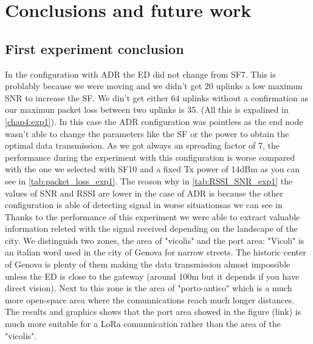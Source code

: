 \chapter{Conclusions and future work}
\label{chap:conclusions}
\ifpdf
    \graphicspath{{Conclusions/Figures/PNG/}{Conclusions/Figures/PDF/}{Conclusions/Figures/}}
\else
    \graphicspath{{Conclusions/Figures/EPS/}{Conclusions/Figures/}}
\fi

\section{First experiment conclusion}

In the configuration with ADR the ED did not change from SF7. This is problably because 
we were moving and we didn't get 20 uplinks a low maximun SNR to increase the SF. We din't 
get either 64 uplinks without a confirmation as our maximun packet loss between two uplinks 
is 35. (All this is expalined in \ref{chap4:exp1}). In this case the ADR configuration was 
pointless as the end node wasn't able to change the parameters like the SF or the power
to obtain the optimal data transmission. As we got always an spreading factor of 7, the performance 
during the experiment with this configuration is worse compared with the one we selected with SF10 
and a fixed Tx power of 14dBm as you can see in \ref{tab:packet_loss_exp1}. The reason why in 
\ref{tab:RSSI_SNR_exp1}
the values of SNR and RSSI are lower in the case of ADR is because the other configuration 
is able of detecting 
signal in worse situationsas we can see in \\
Thanks to the performance of this experiment we were able to extract 
valuable information releted with the signal received depending on the landscape of the city. 
We distinguish two zones, the area of "vicolis" and the port area:
"Vicoli" is an italian word used in the city of Genova for narrow streets. The historic center of Genova 
is plenty of them making the data transmission almost impossible unless the ED
is close to the gateway (around 100m but it depends if you have direct vision). Next to this zone is the 
area of "porto-antico" which is a much more open-space area where the comunnications reach much longer distances.
The results and graphics shows that the port area showed in the figure (link) is much more 
suitable for a LoRa comunnication rather than the area of the "vicolis".

